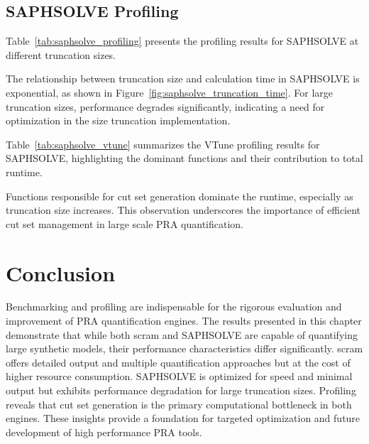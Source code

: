 







\subsection{SAPHSOLVE Profiling}
Table~\ref{tab:saphsolve_profiling} presents the profiling results for SAPHSOLVE at different truncation sizes.



The relationship between truncation size and calculation time in SAPHSOLVE is exponential, as shown in Figure~\ref{fig:saphsolve_truncation_time}. For large truncation sizes, performance degrades significantly, indicating a need for optimization in the size truncation implementation.



Table~\ref{tab:saphsolve_vtune} summarizes the VTune profiling results for SAPHSOLVE, highlighting the dominant functions and their contribution to total runtime.



Functions responsible for cut set generation dominate the runtime, especially as truncation size increases. This observation underscores the importance of efficient cut set management in large scale PRA quantification.

\section{Conclusion}
Benchmarking and profiling are indispensable for the rigorous evaluation and improvement of PRA quantification engines. The results presented in this chapter demonstrate that while both scram and SAPHSOLVE are capable of quantifying large synthetic models, their performance characteristics differ significantly. scram offers detailed output and multiple quantification approaches but at the cost of higher resource consumption. SAPHSOLVE is optimized for speed and minimal output but exhibits performance degradation for large truncation sizes. Profiling reveals that cut set generation is the primary computational bottleneck in both engines. These insights provide a foundation for targeted optimization and future development of high performance PRA tools.

